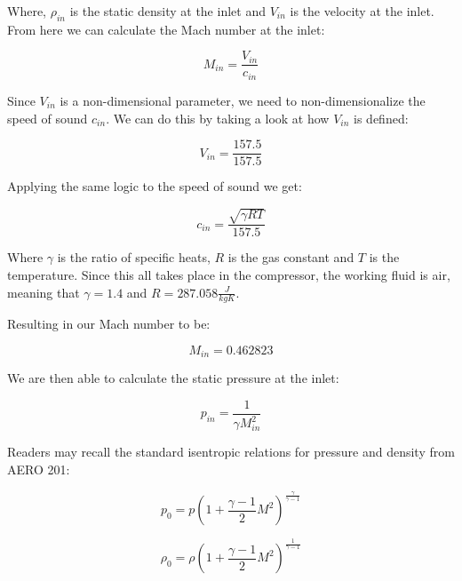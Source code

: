 \documentclass[titlepage]{article}
\begin{document}
Where, $\rho_{in}$ is the static density at the inlet and $V_{in}$ is the velocity at the inlet.  
From here we can calculate the Mach number at the inlet:

\begin{equation}
\label{eq:inlet mach}
M_{in} = \frac{V_{in}}{c_{in}}
\end{equation}

Since $V_{in}$ is a non-dimensional parameter, we need to non-dimensionalize the speed of sound $c_{in}$. 
We can do this by taking a look at how $V_{in}$ is defined:

\begin{equation}
\label{eq:def inlet velocity}
V_{in} = \frac{157.5}{157.5}
\end{equation}

Applying the same logic to the speed of sound we get:

\begin{equation}
\label{eq:def inlet speed of sound}
c_{in} = \frac{\sqrt{\gamma R T}}{157.5}
\end{equation}

Where $\gamma$ is the ratio of specific heats, $R$ is the gas constant and $T$ is the temperature.
Since this all takes place in the compressor, the working fluid is air, meaning that $\gamma = 1.4$
and $R = 287.058 \frac{J}{kgK}$.

Resulting in our Mach number to be:

\begin{equation}
\label{eq:mach}
M_{in} = 0.462823
\end{equation}

We are then able to calculate the static pressure at the inlet:

\begin{equation}
\label{eq:inlet pressure}
p_{in} = \frac{1}{\gamma M_{in}^2}
\end{equation}

Readers may recall the standard isentropic relations for pressure and density from AERO 201:

\begin{equation}
\label{eq:isentropic pressure}
p_{0} = p \left( 1 + \frac{\gamma-1}{2} M^{2} \right)^{\frac{\gamma}{\gamma - 1}}
\end{equation}

\begin{equation}
\label{eq:isentropic density}
\rho_{0} = \rho \left( 1 + \frac{\gamma-1}{2} M^{2} \right)^{\frac{1}{\gamma - 1}}
\end{equation}
\end{document}
